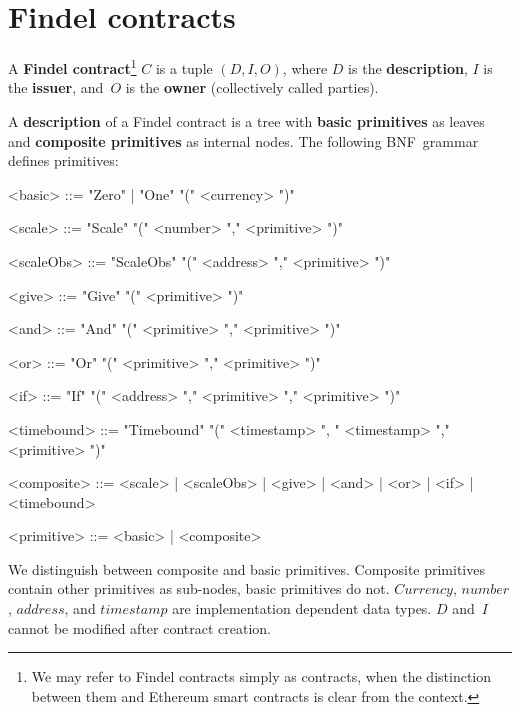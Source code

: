 \section{Findel contracts} \label{sec:Ch10FindelSyntax}

\begin{definition} \label{def:Ch10FindelFindelContract}
	A \textbf{Findel contract}\footnote{We may refer to Findel contracts simply as contracts, when the distinction between them and Ethereum smart contracts is clear from the context.} $C$ is a tuple $(D,I,O)$, where $D$ is the \textbf{description}, $I$ is the \textbf{issuer}, and~$O$ is the \textbf{owner} (collectively called parties).
\end{definition}

\begin{definition} \label{def:Ch10FindelDescription}
	A \textbf{description} of a Findel contract is a tree with \textbf{basic primitives} as leaves and \textbf{composite primitives} as internal nodes. The following BNF~grammar defines primitives:
	\begin{grammar}
		
		<basic> ::= "Zero" | "One" "(" <currency> ")"
		
		<scale> ::= "Scale" "(" <number> "," <primitive> ")"
		
		<scaleObs> ::= "ScaleObs" "(" <address> "," <primitive> ")"
		
		<give> ::= "Give" "(" <primitive> ")"
		
		<and> ::= "And" "(" <primitive> "," <primitive> ")"
		
		<or> ::= "Or" "(" <primitive> "," <primitive> ")"
		
		<if> ::= "If" "(" <address> "," <primitive> "," <primitive> ")"
		
		<timebound> ::= "Timebound" "(" <timestamp> ", " <timestamp> "," <primitive> ")"
		
		<composite> ::= <scale> | <scaleObs> | <give> | <and> | <or> | <if> | <timebound>
		
		<primitive> ::= <basic> | <composite>
		
	\end{grammar}
\end{definition}

We distinguish between composite and basic primitives.
Composite primitives contain other primitives as sub-nodes, basic primitives do not.
\(Currency\), \(number\), \(address\), and \(timestamp\) are implementation dependent data types.
$D$ and~$I$ cannot be modified after contract creation.


